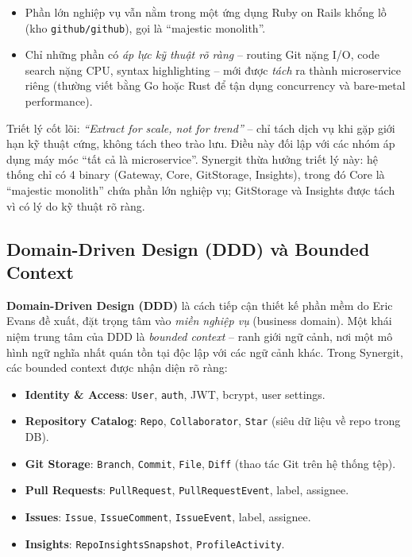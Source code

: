 \begin{itemize}
\item Phần lớn nghiệp vụ vẫn nằm trong một ứng dụng Ruby on Rails khổng lồ (kho \texttt{github/github}), gọi là ``majestic monolith''.
\item Chỉ những phần có \textit{áp lực kỹ thuật rõ ràng} -- routing Git nặng I/O, code search nặng CPU, syntax highlighting -- mới được \textit{tách} ra thành microservice riêng (thường viết bằng Go hoặc Rust để tận dụng concurrency và bare-metal performance).
\end{itemize}

Triết lý cốt lõi: \textit{``Extract for scale, not for trend''} -- chỉ tách dịch vụ khi gặp giới hạn kỹ thuật cứng, không tách theo trào lưu. Điều này đối lập với các nhóm áp dụng máy móc ``tất cả là microservice''. Synergit thừa hưởng triết lý này: hệ thống chỉ có 4 binary (Gateway, Core, GitStorage, Insights), trong đó Core là ``majestic monolith'' chứa phần lớn nghiệp vụ; GitStorage và Insights được tách vì có lý do kỹ thuật rõ ràng.

\subsection{Domain-Driven Design (DDD) và Bounded Context}
\textbf{Domain-Driven Design (DDD)} là cách tiếp cận thiết kế phần mềm do Eric Evans đề xuất, đặt trọng tâm vào \textit{miền nghiệp vụ} (business domain). Một khái niệm trung tâm của DDD là \textit{bounded context} -- ranh giới ngữ cảnh, nơi một mô hình ngữ nghĩa nhất quán tồn tại độc lập với các ngữ cảnh khác. Trong Synergit, các bounded context được nhận diện rõ ràng:

\begin{itemize}
\item \textbf{Identity \& Access}: \texttt{User}, \texttt{auth}, JWT, bcrypt, user settings.
\item \textbf{Repository Catalog}: \texttt{Repo}, \texttt{Collaborator}, \texttt{Star} (siêu dữ liệu về repo trong DB).
\item \textbf{Git Storage}: \texttt{Branch}, \texttt{Commit}, \texttt{File}, \texttt{Diff} (thao tác Git trên hệ thống tệp).
\item \textbf{Pull Requests}: \texttt{PullRequest}, \texttt{PullRequestEvent}, label, assignee.
\item \textbf{Issues}: \texttt{Issue}, \texttt{IssueComment}, \texttt{IssueEvent}, label, assignee.
\item \textbf{Insights}: \texttt{RepoInsightsSnapshot}, \texttt{ProfileActivity}.
\end{itemize}

